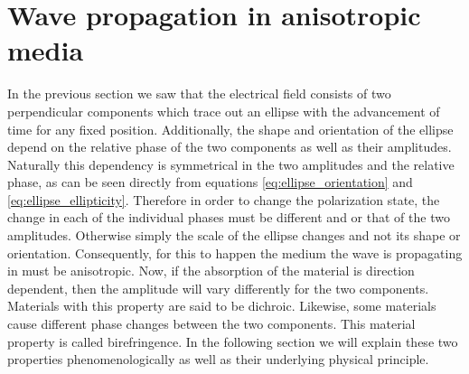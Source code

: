 \section{Wave propagation in anisotropic media}
\label{sec:wave_prop}
In the previous section we saw that the electrical field consists of two perpendicular components which trace out an ellipse with the advancement of time for any fixed position. Additionally, the shape and orientation of the ellipse depend on the relative phase of the two components as well as their amplitudes. Naturally this dependency is symmetrical in the two amplitudes and the relative phase, as can be seen directly from equations \ref{eq:ellipse_orientation} and \ref{eq:ellipse_ellipticity}. Therefore in order to change the polarization state, the change in each of the individual phases must be different and or that of the two amplitudes. Otherwise simply the scale of the ellipse changes and not its shape or orientation. Consequently, for this to happen the medium the wave is propagating in must be anisotropic. Now, if the absorption of the material is direction dependent, then the amplitude will vary differently for the two components. Materials with this property are said to be dichroic. Likewise, some materials cause different phase changes between the two components. This material property is called birefringence. In the following section we will explain these two properties phenomenologically as well as their underlying physical principle.

